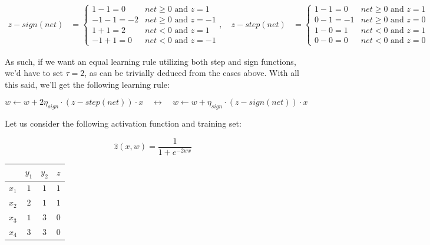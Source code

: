 \documentclass[12pt]{article}
\begin{document}
\begin{enumerate}[leftmargin=\labelsep]
\begin{enumerate}
{          \begin{align*}
            z - sign(net) & = \begin{cases}
                                1 - 1 = 0  & net \geq 0 \text { and } z = 1  \\
                                -1 -1 = -2 & net \geq 0 \text { and } z = -1 \\
                                1 + 1 = 2  & net < 0 \text { and } z = 1     \\
                                -1 + 1 = 0 & net < 0 \text { and } z = -1
                              \end{cases}, \quad
            z - step(net) & = \begin{cases}
                                1 - 1 = 0  & net \geq 0 \text { and } z = 1 \\
                                0 - 1 = -1 & net \geq 0 \text { and } z = 0 \\
                                1 - 0 = 1  & net < 0 \text { and } z = 1    \\
                                0 - 0 = 0  & net < 0 \text { and } z = 0
                              \end{cases}
          \end{align*}

          As such, if we want an equal learning rule utilizing both step and sign
          functions, we'd have to set $\tau = 2$, as can be trivially deduced from
          the cases above. With all this said, we'll get the following learning rule:

          $$
            w \leftarrow w + 2 \eta_{sign} \cdot (z - step(net)) \cdot x \quad \leftrightarrow \quad
            w \leftarrow w + \eta_{sign} \cdot (z - sign(net)) \cdot x
          $$
          }
  \end{enumerate}

  \begin{tcolorbox}[enhanced jigsaw,colback=bg,boxrule=0pt,arc=1pt,halign=center]
    \item Let us consider the following activation function and training set:

    \begin{equation*}
      \hat{z}(x, w) = \frac{1}{1 + e^{-2 w x}}
    \end{equation*}

    \begin{table}[H]
      \centering
      \begin{tabular}{c|c|c|c}
              & $y_1$ & $y_2$ & $z$ \\ \hline
        $x_1$ & $1$   & $1$   & $1$ \\
        $x_2$ & $2$   & $1$   & $1$ \\
        $x_3$ & $1$   & $3$   & $0$ \\
        $x_4$ & $3$   & $3$   & $0$
      \end{tabular}
    \end{table}


\end{tcolorbox}
\end{enumerate}
\end{document}
